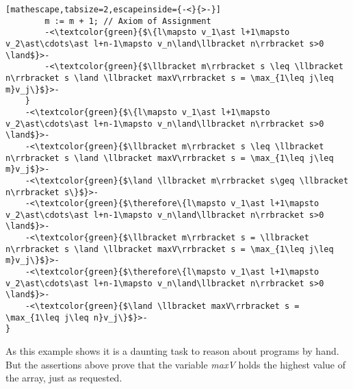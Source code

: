 \begin{myexp}
\begin{lstlisting}[mathescape,tabsize=2,escapeinside={-<}{>-}]
		m := m + 1; // Axiom of Assignment
		-<\textcolor{green}{$\{l\mapsto v_1\ast l+1\mapsto v_2\ast\cdots\ast l+n-1\mapsto v_n\land\llbracket n\rrbracket s>0 \land$}>-
		-<\textcolor{green}{$\llbracket m\rrbracket s \leq \llbracket n\rrbracket s \land \llbracket maxV\rrbracket s = \max_{1\leq j\leq m}v_j\}$}>-
	}
	-<\textcolor{green}{$\{l\mapsto v_1\ast l+1\mapsto v_2\ast\cdots\ast l+n-1\mapsto v_n\land\llbracket n\rrbracket s>0 \land$}>-
	-<\textcolor{green}{$\llbracket m\rrbracket s \leq \llbracket n\rrbracket s \land \llbracket maxV\rrbracket s = \max_{1\leq j\leq m}v_j$}>-
	-<\textcolor{green}{$\land \llbracket m\rrbracket s\geq \llbracket n\rrbracket s\}$}>-
	-<\textcolor{green}{$\therefore\{l\mapsto v_1\ast l+1\mapsto v_2\ast\cdots\ast l+n-1\mapsto v_n\land\llbracket n\rrbracket s>0 \land$}>-
	-<\textcolor{green}{$\llbracket m\rrbracket s = \llbracket n\rrbracket s \land \llbracket maxV\rrbracket s = \max_{1\leq j\leq m}v_j\}$}>-
	-<\textcolor{green}{$\therefore\{l\mapsto v_1\ast l+1\mapsto v_2\ast\cdots\ast l+n-1\mapsto v_n\land\llbracket n\rrbracket s>0 \land$}>-
	-<\textcolor{green}{$\land \llbracket maxV\rrbracket s = \max_{1\leq j\leq n}v_j\}$}>-
}
		\end{lstlisting}
	As this example shows it is a daunting task to reason about programs by hand.
	But the assertions above prove that the variable \emph{maxV}
	holds the highest value of the array, just as requested.
	\end{myexp}
